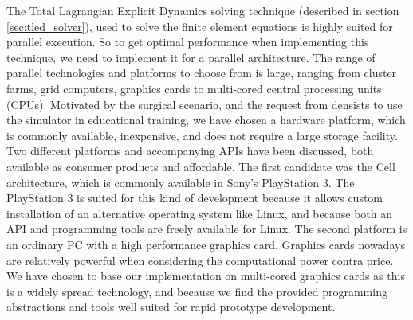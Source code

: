 
The Total Lagrangian Explicit Dynamics solving technique (described in
section \ref{sec:tled_solver}), used to solve the finite element
equations is highly suited for parallel execution. So to
get optimal performance when implementing this technique, we need to
implement it for a parallel architecture.
%
The range of parallel technologies and platforms to choose from is
large, ranging from cluster farms, grid computers, graphics cards to
multi-cored central processing units (CPUs).
%
Motivated by the surgical scenario, and the request from densists to
use the simulator in educational training, we have chosen a hardware
platform, which is commonly available, inexpensive, and does not require
a large storage facility.
%
Two different platforms and accompanying APIs have been discussed, both
available as consumer products and affordable.
%
The first candidate was the Cell architecture, which
is commonly available in Sony's PlayStation 3. The PlayStation 3 is
suited for this kind of development because it allows custom installation of
an alternative operating system like Linux, and because both an API and
programming tools are freely available for Linux.
%
The second platform is an ordinary PC with a high performance graphics
card. Graphics cards nowadays are relatively powerful when considering
the computational power contra price.
%
We have chosen to base our implementation on multi-cored graphics
cards as this is a widely spread technology, and because we find the
provided programming abstractions and tools well suited for rapid
prototype development.
%

